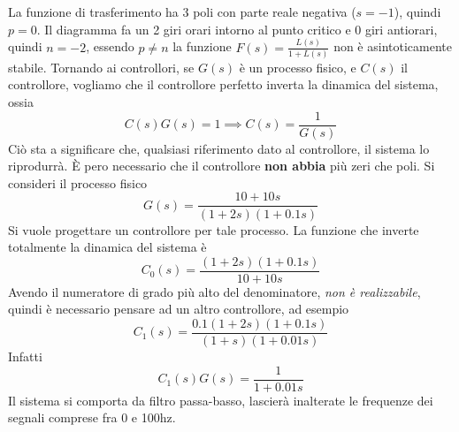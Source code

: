 \documentclass[10pt, letterpaper]{report}
\begin{document}
La funzione di trasferimento ha 3 poli con parte reale negativa ($s=-1$), quindi $p=0$. Il diagramma fa un 2 giri orari intorno al punto critico e 0 giri antiorari, quindi $n=-2$, essendo $p\ne n$ la funzione $F(s)=\frac{L(s)}{1+L(s)}$ non è asintoticamente stabile.\acc
Tornando ai controllori, se $G(s)$ è un processo fisico, e $C(s)$ il controllore, vogliamo che il controllore perfetto inverta la dinamica del sistema, ossia 
$$ C(s)G(s)=1\implies C(s)=\frac{1}{G(s)}$$
Ciò sta a significare che, qualsiasi riferimento dato al controllore, il sistema lo riprodurrà. È pero necessario che il controllore \textbf{non abbia} più zeri che poli. Si consideri il processo fisico 
$$ G(s)=\frac{10+10s}{(1+2s)(1+0.1s)}$$
Si vuole progettare un controllore per tale processo. La funzione che inverte totalmente la dinamica del sistema è 
$$ C_0(s)=\frac{(1+2s)(1+0.1s)}{10+10s}$$
Avendo il numeratore di grado più alto del denominatore, \textit{non è realizzabile}, quindi è necessario pensare ad un altro controllore, ad esempio 
$$ C_1(s)=\frac{0.1(1+2s)(1+0.1s)}{(1+s)(1+0.01s)}$$
Infatti 
$$ C_1(s)G(s)=\frac{1}{1+0.01s}$$
Il sistema si comporta da filtro passa-basso, lascierà inalterate le frequenze dei segnali comprese fra 0 e 100hz.
\flowerLine
\end{document}
